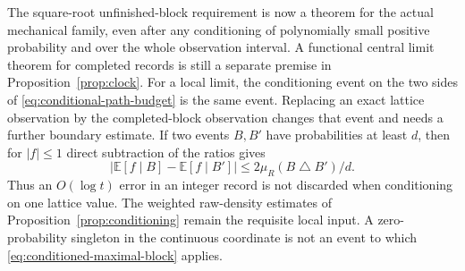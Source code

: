 \begin{remark}
\label{rem:conditional-interface-scope}
The square-root unfinished-block requirement is now a theorem for the
actual mechanical family, even after any conditioning of polynomially
small positive probability and over the whole observation interval. A
functional central limit theorem for completed records is still a
separate premise in Proposition~\ref{prop:clock}. For a local limit, the
conditioning event on the two sides of \eqref{eq:conditional-path-budget}
is the same event. Replacing an exact lattice observation by the
completed-block observation changes that event and needs a further
boundary estimate. If two events $B,B'$ have probabilities at least $d$,
then for $|f|\le1$ direct subtraction of the ratios gives
\[
 |\mathbb E[f\mid B]-\mathbb E[f\mid B']|
             \le2\mu_R(B\mathbin\triangle B')/d.
\]
Thus an $O(\log t)$ error in an integer record is not discarded when
conditioning on one lattice value. The weighted raw-density estimates
of Proposition~\ref{prop:conditioning} remain the requisite local input.
A zero-probability singleton in the continuous coordinate is not an event
to which \eqref{eq:conditioned-maximal-block} applies.
\end{remark}
